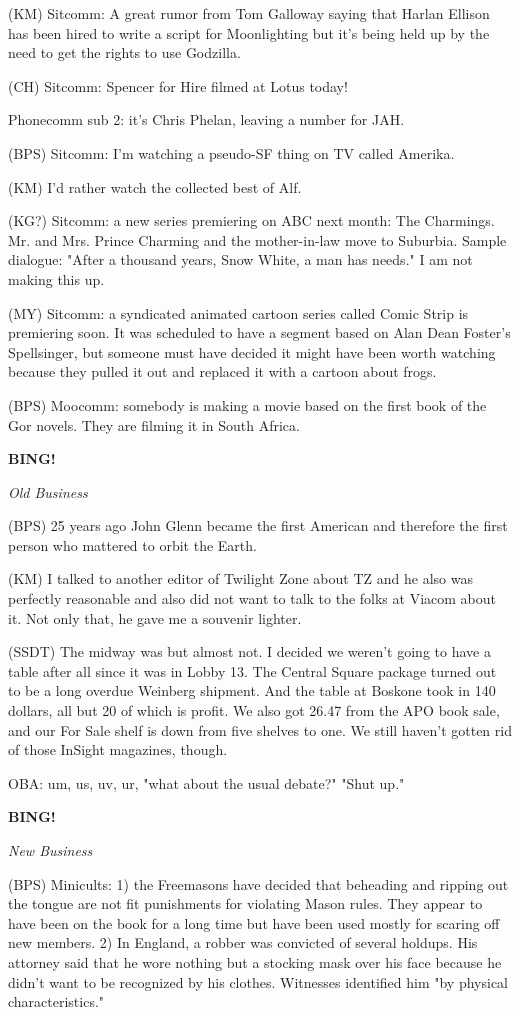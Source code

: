\documentclass[12pt]{article}
\newcommand{\bing}{{\bf BING!} }
\newcommand{\goto}[1]{\bing \vskip 12pt \centerline{{\em{#1}}}}
\begin{document}
(KM) Sitcomm: A great rumor from Tom Galloway saying that Harlan Ellison has been hired to write a script for Moonlighting but it's being held up by the need to get the rights to use Godzilla.

(CH) Sitcomm: Spencer for Hire filmed at Lotus today!

Phonecomm sub 2: it's Chris Phelan, leaving a number for JAH.

(BPS) Sitcomm: I'm watching a pseudo-SF thing on TV called Amerika.

(KM) I'd rather watch the collected best of Alf.

(KG?) Sitcomm: a new series premiering on ABC next month: The Charmings. Mr. and Mrs. Prince Charming and the mother-in-law move to Suburbia. Sample dialogue: "After a thousand years, Snow White, a man has needs." I am not making this up.

(MY) Sitcomm: a syndicated animated cartoon series called Comic Strip is premiering soon. It was scheduled to have a segment based on Alan Dean Foster's Spellsinger, but someone must have decided it might have been worth watching because they pulled it out and replaced it with a cartoon about frogs.

(BPS) Moocomm: somebody is making a movie based on the first book of the Gor novels. They are filming it in South Africa.

\goto{Old Business}

(BPS) 25 years ago John Glenn became the first American and therefore the first person who mattered to orbit the Earth.

(KM) I talked to another editor of Twilight Zone about TZ and he also was perfectly reasonable and also did not want to talk to the folks at Viacom about it. Not only that, he gave me a souvenir lighter.

(SSDT) The midway was but almost not. I decided we weren't going to have a table after all since it was in Lobby 13. The Central Square package turned out to be a long overdue Weinberg shipment. And the table at Boskone took in 140 dollars, all but 20 of which is profit. We also got 26.47 from the APO book sale, and our For Sale shelf is down from five shelves to one. We still haven't gotten rid of those InSight magazines, though.

OBA: um, us, uv, ur, "what about the usual debate?" "Shut up."

\goto{New Business}

(BPS) Minicults: 1) the Freemasons have decided that beheading and ripping out the tongue are not fit punishments for violating Mason rules. They appear to have been on the book for a long time but have been used mostly for scaring off new members. 2) In England, a robber was convicted of several holdups. His attorney said that he wore nothing but a stocking mask over his face because he didn't want to be recognized by his clothes. Witnesses identified him "by physical characteristics."
\end{document}
